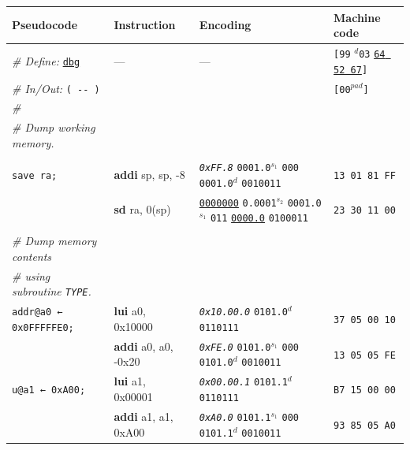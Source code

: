 \documentclass[a4paper,12pt,final]{article}
\begin{document}
\begin{table}[!htbp] \begin{adjustwidth}{-1cm}{-1cm} \fontsize{8}{9.600000}\selectfont
\begin{center}
\begin{tabular}{l|ll|l}
\textbf{Pseudocode} & \textbf{Instruction} & \textbf{Encoding} & \textbf{Machine code}\\[0pt]
\hline
\emph{\# Define:} \uline{\texttt{dbg}} & --- & --- & \texttt{[99} \(^{d}\)​\texttt{03} \uline{\texttt{64 52 67}}​\texttt{]}​\\[0pt]
\emph{\# In/Out:} \texttt{( -​- )} &  &  & \texttt{[00}​\(^{pad}\)​\texttt{]}\\[0pt]
\emph{\#} &  &  & \\[0pt]
\emph{\# Dump working memory.} &  &  & \\[0pt]
 &  &  & \\[0pt]
\texttt{save ra;} & \textbf{addi} sp, sp, -8 & \emph{\texttt{0xFF.8}}                    \texttt{0001.0}​\(^{s_{1}}\) \texttt{000} \texttt{0001.0}​\(^{d}\)  \texttt{0010011} & \texttt{13 01 81 FF}\\[0pt]
 & \textbf{sd} ra, 0(sp) & \uline{\texttt{0000000}} \texttt{0.0001}​\(^{s_{2}}\) \texttt{0001.0}​\(^{s_{1}}\) \texttt{011} \uline{\texttt{0000.0}} \texttt{0100011} & \texttt{23 30 11 00}\\[0pt]
 &  &  & \\[0pt]
\emph{\# Dump memory contents} &  &  & \\[0pt]
\emph{\# using subroutine \texttt{TYPE}.} &  &  & \\[0pt]
\texttt{addr@a0 ← 0x0FFFFFE0;} & \textbf{lui} a0, 0x10000 & \emph{\texttt{0x10.00.0}}                                                  \texttt{0101.0}​\(^{d}\)  \texttt{0110111} & \texttt{37 05 00 10}\\[0pt]
 & \textbf{addi} a0, a0, -0x20 & \emph{\texttt{0xFE.0}}                    \texttt{0101.0}​\(^{s_{1}}\) \texttt{000} \texttt{0101.0}​\(^{d}\)  \texttt{0010011} & \texttt{13 05 05 FE}\\[0pt]
\texttt{u@a1 ← 0xA00;} & \textbf{lui} a1, 0x00001 & \emph{\texttt{0x00.00.1}}                                                  \texttt{0101.1}​\(^{d}\)  \texttt{0110111} & \texttt{B7 15 00 00}\\[0pt]
 & \textbf{addi} a1, a1, 0xA00 & \emph{\texttt{0xA0.0}}                    \texttt{0101.1}​\(^{s_{1}}\) \texttt{000} \texttt{0101.1}​\(^{d}\)  \texttt{0010011} & \texttt{93 85 05 A0}\\[0pt]

\end{tabular}
\end{center}
\end{adjustwidth}
\end{table}
\end{document}
